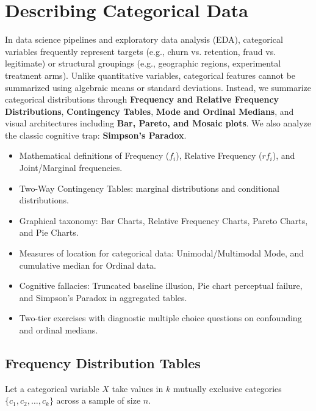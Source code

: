 \chapter{Describing Categorical Data}

In data science pipelines and exploratory data analysis (EDA), categorical variables frequently represent targets (e.g., churn vs. retention, fraud vs. legitimate) or structural groupings (e.g., geographic regions, experimental treatment arms). Unlike quantitative variables, categorical features cannot be summarized using algebraic means or standard deviations. Instead, we summarize categorical distributions through \textbf{Frequency and Relative Frequency Distributions}, \textbf{Contingency Tables}, \textbf{Mode and Ordinal Medians}, and visual architectures including \textbf{Bar, Pareto, and Mosaic plots}. We also analyze the classic cognitive trap: \textbf{Simpson's Paradox}.

\vspace{0.5cm}
\begin{tcolorbox}[colback=primarylight, colframe=primarydark, title={\textbf{What You'll Learn in this Chapter}}]
\begin{itemize}
    \item Mathematical definitions of Frequency ($f_i$), Relative Frequency ($rf_i$), and Joint/Marginal frequencies.
    \item Two-Way Contingency Tables: marginal distributions and conditional distributions.
    \item Graphical taxonomy: Bar Charts, Relative Frequency Charts, Pareto Charts, and Pie Charts.
    \item Measures of location for categorical data: Unimodal/Multimodal Mode, and cumulative median for Ordinal data.
    \item Cognitive fallacies: Truncated baseline illusion, Pie chart perceptual failure, and Simpson's Paradox in aggregated tables.
    \item Two-tier exercises with diagnostic multiple choice questions on confounding and ordinal medians.
\end{itemize}
\end{tcolorbox}

\section{Frequency Distribution Tables}

Let a categorical variable $X$ take values in $k$ mutually exclusive categories $\{c_1, c_2, \dots, c_k\}$ across a sample of size $n$.

